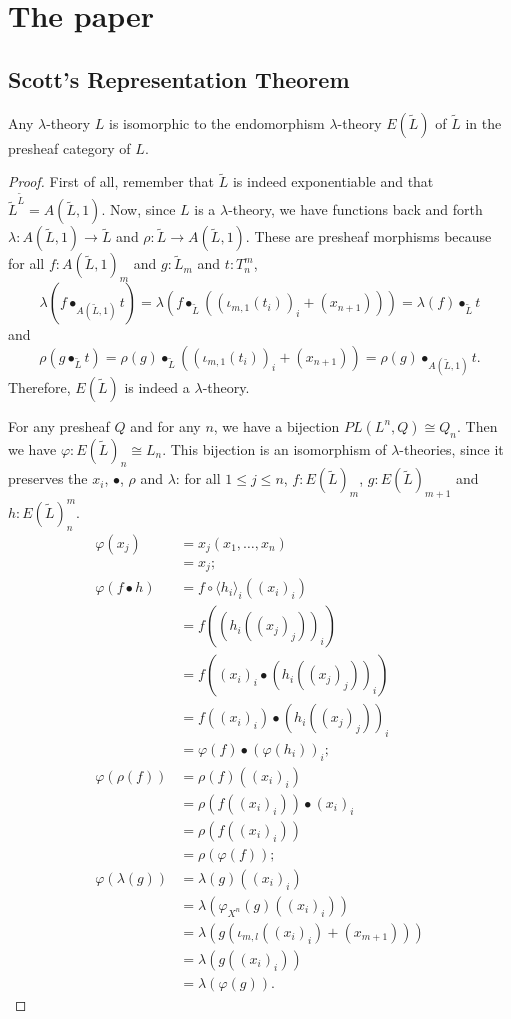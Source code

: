 \chapter{The paper}

\section{Scott's Representation Theorem}
\begin{theorem}
  Any $ \lambda $-theory $ L $ is isomorphic to the endomorphism $ \lambda $-theory $ E(\tilde L) $ of $ \tilde L $ in the presheaf category of $ L $.
\end{theorem}
\begin{proof}
  First of all, remember that $ \tilde L $ is indeed exponentiable and that $ \tilde L^{\tilde L} = A(\tilde L, 1) $.
  Now, since $ L $ is a $ \lambda $-theory, we have functions back and forth $ \lambda: A(\tilde L, 1) \to \tilde L $ and $ \rho: \tilde L \to A(\tilde L, 1) $. These are presheaf morphisms because for all $ f: A(\tilde L, 1)_m $ and $ g: \tilde L_m $ and $ t: T_n^m $,
  \[ \lambda(f \bullet_{A(\tilde L, 1)} t) = \lambda(f \bullet_{\tilde L} ((\iota_{m, 1}(t_i))_i + (x_{n + 1}))) = \lambda(f) \bullet_{\tilde L} t \]
  and
  \[ \rho(g \bullet_{\tilde L} t) = \rho(g) \bullet_{\tilde L} ((\iota_{m, 1}(t_i))_i + (x_{n + 1})) = \rho(g) \bullet_{A(\tilde L, 1)} t. \]
  Therefore, $ E(\tilde L) $ is indeed a $ \lambda $-theory.

  For any presheaf $ Q $ and for any $ n $, we have a bijection $ PL(L^n, Q) \cong Q_n $.
  Then we have $ \varphi: E(\tilde L)_n \cong L_n $.
  This bijection is an isomorphism of $ \lambda $-theories, since it preserves the $ x_i $, $ \bullet $, $ \rho $ and $ \lambda $: for all $ 1 \leq j \leq n $, $ f: E(\tilde L)_m $, $ g: E(\tilde L)_{m + 1} $ and $ h: E(\tilde L)_n^m $.
  \begin{align*}
    \varphi(x_j) &= x_j(x_1, \dots, x_n)\\
    &= x_j;\\
    \varphi(f \bullet h) &= f \circ \langle h_i \rangle_i((x_i)_i)\\
    &= f((h_i((x_j)_j))_i)\\
    &= f((x_i)_i \bullet (h_i((x_j)_j))_i)\\
    &= f((x_i)_i) \bullet (h_i((x_j)_j))_i\\
    &= \varphi(f) \bullet (\varphi(h_i))_i;\\
    \varphi(\rho(f)) &= \rho(f)((x_i)_i)\\
    &= \rho(f((x_i)_i)) \bullet (x_i)_i\\
    &= \rho(f((x_i)_i))\\
    &= \rho(\varphi(f));\\
    \varphi(\lambda(g)) &= \lambda(g)((x_i)_i)\\
    &= \lambda(\varphi_{X^n}(g)((x_i)_i))\\
    &= \lambda(g(\iota_{m, l}((x_i)_i) + (x_{m + 1})))\\
    &= \lambda(g((x_i)_i))\\
    &= \lambda(\varphi(g)).
  \end{align*}
\end{proof}

